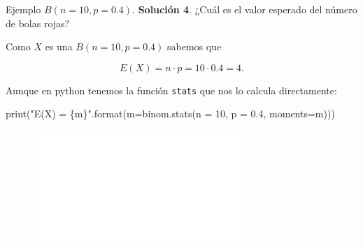 \documentclass[
  ignorenonframetext,
  aspectratio=169]{beamer}
\newenvironment{Shaded}{\begin{snugshade}}{\end{snugshade}}
\newcommand{\BuiltInTok}[1]{\textcolor[rgb]{0.00,0.23,0.31}{#1}}
\newcommand{\DecValTok}[1]{\textcolor[rgb]{0.68,0.00,0.00}{#1}}
\newcommand{\FloatTok}[1]{\textcolor[rgb]{0.68,0.00,0.00}{#1}}
\newcommand{\NormalTok}[1]{\textcolor[rgb]{0.00,0.23,0.31}{#1}}
\newcommand{\OperatorTok}[1]{\textcolor[rgb]{0.37,0.37,0.37}{#1}}
\newcommand{\SpecialCharTok}[1]{\textcolor[rgb]{0.37,0.37,0.37}{#1}}
\newcommand{\StringTok}[1]{\textcolor[rgb]{0.13,0.47,0.30}{#1}}
\begin{document}
\begin{frame}[fragile]{Ejemplo \(B(n=10,p=0.4).\)}
\protect\hypertarget{ejemplo-bn10p0.4.-6}{}
\textbf{Solución 4}. ¿Cuál es el valor esperado del número de bolas
rojas?

Como \(X\) es una \(B(n=10,p=0.4)\) sabemos que

\[E(X)=n\cdot p = 10\cdot 0.4=4.\]

Aunque en python tenemos la función \texttt{stats} que nos lo calcula
directamente:

\begin{Shaded}
\begin{Highlighting}[]
\BuiltInTok{print}\NormalTok{(}\StringTok{"E(X) = }\SpecialCharTok{\{m\}}\StringTok{"}\NormalTok{.}\BuiltInTok{format}\NormalTok{(m}\OperatorTok{=}\NormalTok{binom.stats(n }\OperatorTok{=} \DecValTok{10}\NormalTok{, p }\OperatorTok{=} \FloatTok{0.4}\NormalTok{, moments}\OperatorTok{=}\StringTok{\textquotesingle{}m\textquotesingle{}}\NormalTok{)))}
\end{Highlighting}
\end{Shaded}

\begin{figure}

{\centering \includegraphics[width=0.7\textwidth,height=\textheight]{Tema_3_1_Notables_files/figure-beamer/unnamed-chunk-16-1.pdf}

}

\end{figure}
\end{frame}
\end{document}
